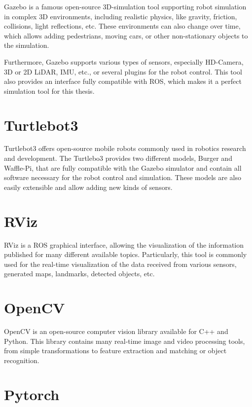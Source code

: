Gazebo is a famous open-source 3D-simulation tool supporting robot simulation in complex 3D environments, including realistic physics, like gravity, friction, collisions, light reflections, etc. These environments can also change over time, which allows adding pedestrians, moving cars, or other non-stationary objects to the simulation.\par
Furthermore, Gazebo supports various types of sensors, especially HD-Camera, 3D or 2D LiDAR, IMU, etc., or several plugins for the robot control. This tool also provides an interface fully compatible with ROS, which makes it a perfect simulation tool for this thesis.

\section{Turtlebot3}\label{section:turtlebot}

Turtlebot3 offers open-source mobile robots commonly used in robotics research and development. The Turtlebo3 provides two different models, Burger and Waffle-Pi, that are fully compatible with the Gazebo simulator and contain all software necessary for the robot control and simulation. These models are also easily extensible and allow adding new kinds of sensors.

\section{RViz}\label{section:rviz}

RViz is a ROS graphical interface, allowing the visualization of the information published for many different available topics. Particularly, this tool is commonly used for the real-time visualization of the data received from various sensors, generated maps, landmarks, detected objects, etc.

\section{OpenCV}\label{section:openCv}

OpenCV\cite{OpenCV} is an open-source computer vision library available for C++ and Python. This library contains many real-time image and video processing tools, from simple transformations to feature extraction and matching or object recognition.

\section{Pytorch}\label{section:pytorch}


